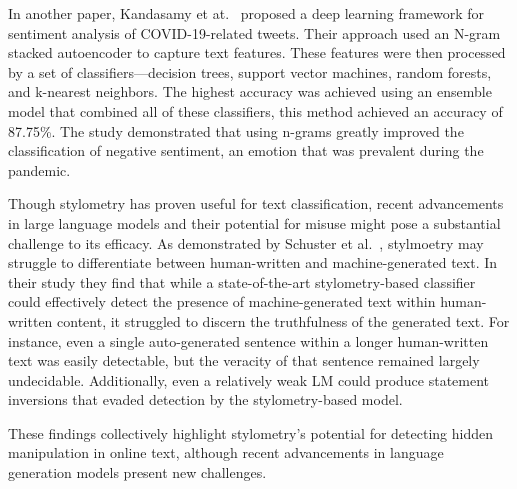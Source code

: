 \documentclass[twoside]{ctuthesis}
\theoremstyle{plain}
\theoremstyle{definition}
\theoremstyle{note}
\begin{document}
In another paper, Kandasamy et at.~\cite{Kandasamy2021COVID} proposed a deep learning framework for sentiment analysis of COVID-19-related tweets. Their approach used an N-gram stacked autoencoder to capture text features. These features were then processed by a set of classifiers—decision trees, support vector machines, random forests, and k-nearest neighbors. The highest accuracy was achieved using an ensemble model that combined all of these classifiers, this method achieved an accuracy of 87.75\%. The study demonstrated that using n-grams greatly improved the classification of negative sentiment, an emotion that was prevalent during the pandemic.\par

Though stylometry has proven useful for text classification, recent advancements in large language models and their potential for misuse might pose a substantial challenge to its efficacy. As demonstrated by Schuster et al.~\cite{Schuster2020}, stylmoetry may struggle to differentiate between human-written and machine-generated text. In their study they find that while a state-of-the-art stylometry-based classifier could effectively detect the presence of machine-generated text within human-written content, it struggled to discern the truthfulness of the generated text.  For instance, even a single auto-generated sentence within a longer human-written text was easily detectable, but the veracity of that sentence remained largely undecidable.  Additionally, even a relatively weak LM could produce statement inversions that evaded detection by the stylometry-based model.\par

These findings collectively highlight stylometry's potential for detecting hidden manipulation in online text, although recent advancements in language generation models present new challenges.\par
\end{document}
